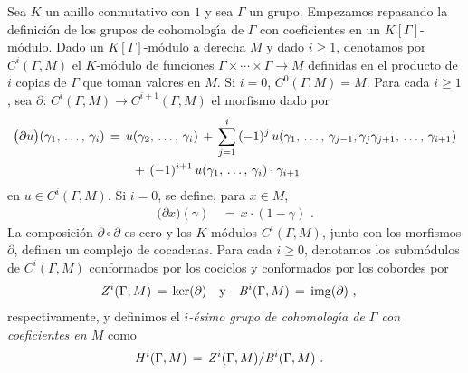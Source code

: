 Sea $K$ un anillo conmutativo con $1$ y sea $\Gamma$ un grupo. Empezamos
repasando la definici\'{o}n de los grupos de cohomolog\'{\i}a de $\Gamma$ con
coeficientes en un $K[\Gamma]$-m\'{o}dulo. Dado un $K[\Gamma]$-m\'{o}dulo a
derecha $M$ y dado $i\geq 1$, denotamos por $C^{i}(\Gamma,M)$ el $K$-m\'{o}dulo
de funciones $\Gamma\times\cdots\times\Gamma\rightarrow M$ definidas en el
producto de $i$ copias de $\Gamma$ que toman valores en $M$. Si $i=0$,
$C^{0}(\Gamma,M)=M$. Para cada $i\geq 1$, sea
\begin{math}
	\partial:\,C^{i}(\Gamma,M)\rightarrow C^{i+1}(\Gamma,M)
\end{math}
el morfismo dado por
\begin{align*}
	\big(\partial u\big)(\lista{\gamma}{i}) & \,=\,
		u(\lista[2]{\gamma}{i})\,+\,
		\sum_{j=1}^{i}\,(-1)^{j}\,u(\lista{\gamma}{j-1},
			\gamma_{j}\lista[j+1]{\gamma}{i+1}) \\
	& \qquad\,+\,(-1)^{i+1}\,u(\lista{\gamma}{i})\cdot\gamma_{i+1}
\end{align*}
%
en $u\in C^{i}(\Gamma,M)$. Si $i=0$, se define, para $x\in M$,
\begin{align*}
	\big(\partial x\big)(\gamma) & \,=\,
		x\cdot(1-\gamma)
	\text{ .}
\end{align*}
%
La composici\'{o}n $\partial\circ\partial$ es cero y los $K$-m\'{o}dulos
$C^{i}(\Gamma,M)$, junto con los morfismos $\partial$, definen un complejo de
cocadenas. Para cada $i\geq 0$, denotamos los subm\'{o}dulos de
$C^{i}(\Gamma,M)$ conformados por los cociclos y conformados por los cobordes
por
\begin{align*}
	\cociclos[i]{\Gamma,M} \,=\,\ker(\partial) & \quad\text{y}\quad
	\cobordes[i]{\Gamma,M}\,=\,\img(\partial)
	\text{ ,}
\end{align*}
%
respectivamente, y definimos el \emph{$i$-\'{e}simo grupo de cohomolog\'{\i}a %
de $\Gamma$ con coeficientes en $M$} como
\begin{align*}
	\cohomolo[i]{\Gamma,M} & \,=\,
		\cociclos[i]{\Gamma,M}/\cobordes[i]{\Gamma,M}
	\text{ .}
\end{align*}
%


